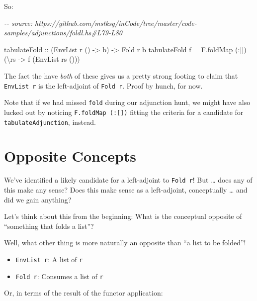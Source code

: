 \documentclass[]{article}
\newenvironment{Shaded}{}{}
\newcommand{\CommentTok}[1]{\textcolor[rgb]{0.38,0.63,0.69}{\textit{#1}}}
\newcommand{\DataTypeTok}[1]{\textcolor[rgb]{0.56,0.13,0.00}{#1}}
\newcommand{\NormalTok}[1]{#1}
\newcommand{\OperatorTok}[1]{\textcolor[rgb]{0.40,0.40,0.40}{#1}}
\newcommand{\OtherTok}[1]{\textcolor[rgb]{0.00,0.44,0.13}{#1}}
\begin{document}
So:

\begin{Shaded}
\begin{Highlighting}[]
\CommentTok{{-}{-} source: https://github.com/mstksg/inCode/tree/master/code{-}samples/adjunctions/foldl.hs\#L79{-}L80}

\OtherTok{tabulateFold ::}\NormalTok{ (}\DataTypeTok{EnvList}\NormalTok{ r () }\OtherTok{{-}>}\NormalTok{ b) }\OtherTok{{-}>} \DataTypeTok{Fold}\NormalTok{ r b}
\NormalTok{tabulateFold f }\OtherTok{=}\NormalTok{ F.foldMap (}\OperatorTok{:}\NormalTok{[]) (\textbackslash{}rs }\OtherTok{{-}>}\NormalTok{ f (}\DataTypeTok{EnvList}\NormalTok{ rs ()))}
\end{Highlighting}
\end{Shaded}

The fact the have \emph{both} of these gives us a pretty strong footing to claim
that \texttt{EnvList\ r} is the left-adjoint of \texttt{Fold\ r}. Proof by
hunch, for now.

Note that if we had missed \texttt{fold} during our adjunction hunt, we might
have also lucked out by noticing \texttt{F.foldMap\ (:{[}{]})} fitting the
criteria for a candidate for \texttt{tabulateAdjunction}, instead.

\hypertarget{opposite-concepts}{%
\section{Opposite Concepts}\label{opposite-concepts}}

We've identified a likely candidate for a left-adjoint to \texttt{Fold\ r}! But
\ldots{} does any of this make any sense? Does this make sense as a
left-adjoint, conceptually \ldots{} and did we gain anything?

Let's think about this from the beginning: What is the conceptual opposite of
``something that folds a list''?

Well, what other thing is more naturally an opposite than ``a list to be
folded''!

\begin{itemize}
\tightlist
\item
  \texttt{EnvList\ r}: A list of \texttt{r}
\item
  \texttt{Fold\ r}: Consumes a list of \texttt{r}
\end{itemize}

Or, in terms of the result of the functor application:
\end{document}
